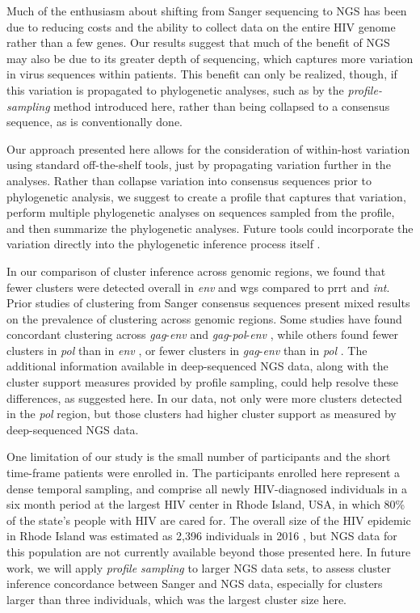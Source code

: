 \documentclass[letterpaper]{article}
\begin{document}
Much of the enthusiasm about shifting from Sanger sequencing to NGS has been due to reducing costs and the ability to collect data on the entire HIV genome rather than a few genes. Our results suggest that much of the benefit of NGS may also be due to its greater depth of sequencing, which captures more variation in virus sequences within patients. This benefit can only be realized, though, if this variation is propagated to phylogenetic analyses, such as by the \emph{profile-sampling} method introduced here, rather than being collapsed to a consensus sequence, as is conventionally done.

Our approach presented here allows for the consideration of within-host variation using standard off-the-shelf tools, just by propagating variation further in the analyses. Rather than collapse variation into consensus sequences prior to phylogenetic analysis, we suggest to create a profile that captures that variation, perform multiple phylogenetic analyses on sequences sampled from the profile, and then summarize the phylogenetic analyses. Future tools could incorporate the variation directly into the phylogenetic inference process itself \cite{guang}.

In our comparison of cluster inference across genomic regions, we found that fewer clusters were detected overall in \emph{env} and wgs compared to prrt and \emph{int}. Prior studies of clustering from Sanger consensus sequences present mixed results on the prevalence of clustering across genomic regions. Some studies have found concordant clustering across \emph{gag}-\emph{env} \parencite{han} and \emph{gag}-\emph{pol}-\emph{env} \parencite{english,kaye}, while others found fewer clusters in \emph{pol} than in \emph{env} \parencite{kapaata}, or fewer clusters in \emph{gag}-\emph{env} than in \emph{pol} \parencite{ndiaye}. The additional information available in deep-sequenced NGS data, along with the cluster support measures provided by profile sampling, could help resolve these differences, as suggested here. In our data, not only were more clusters detected in the \emph{pol} region, but those clusters had higher cluster support as measured by deep-sequenced NGS data.

One limitation of our study is the small number of participants and the short time-frame patients were enrolled in. The participants enrolled here represent a dense temporal sampling, and comprise all newly HIV-diagnosed individuals in a six month period at the largest HIV center in Rhode Island, USA, in which 80\% of the state's people with HIV are cared for. The overall size of the HIV epidemic in Rhode Island was estimated as 2,396 individuals in 2016 \parencite{ridoh}, but NGS data for this population are not currently available beyond those presented here. In future work, we will apply \emph{profile sampling} to larger NGS data sets, to assess cluster inference concordance between Sanger and NGS data, especially for clusters larger than three individuals, which was the largest cluster size here.
\end{document}
